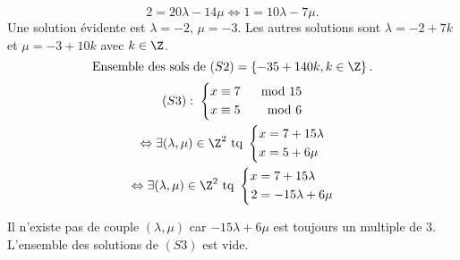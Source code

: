 \[
  2 = 20 \lambda - 14 \mu \Leftrightarrow 1 = 10\lambda - 7\mu.
\]
Une solution évidente est $\lambda = -2$, $\mu = -3$. Les autres solutions sont $\lambda = -2 + 7k$ et $\mu = -3 + 10k$ avec $k\in \Z$.
\[
\text{Ensemble des sols de }(S2) =  \left\lbrace -35 + 140k, k\in \Z \right\rbrace.
\]
\begin{multline*}
  (S3): \;\left\lbrace
  \begin{aligned}
    x &\equiv 7 &\mod 15 \\
    x &\equiv 5 &\mod 6
  \end{aligned}
  \right.\\
\Leftrightarrow
\exists (\lambda, \mu) \in \Z^2 \text{ tq }
  \left\lbrace
  \begin{aligned}
    x &= 7 + 15 \lambda  \\
    x &= 5 + 6\mu
  \end{aligned}
\right.\\
\Leftrightarrow
\exists (\lambda, \mu) \in \Z^2 \text{ tq }
  \left\lbrace
  \begin{aligned}
    x &= 7 + 15 \lambda  \\
    2 &= -15\lambda + 6\mu
  \end{aligned}
\right.
\end{multline*}

Il n'existe pas de couple $(\lambda, \mu)$ car $-15\lambda + 6\mu$ est toujours un multiple de $3$.\newline
L'ensemble des solutions de $(S3)$ est vide.
